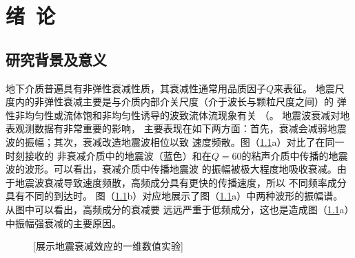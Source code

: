 


\newcommand{\citeA}[2]{\citeauthor{#1}\cite{#1}}

\chapter{绪~论}

\section{研究背景及意义}
地下介质普遍具有非弹性衰减性质，其衰减性通常用品质因子$Q$来表征。
地震尺度内的非弹性衰减主要是与介质内部介关尺度（介于波长与颗粒尺度之间）的
弹性非均匀性或流体饱和非均匀性诱导的波致流体流现象有关
（\citeA{pride:2003}，\citeA{muller:2010}）。
地震波衰减对地表观测数据有非常重要的影响，
主要表现在如下两方面：首先，衰减会减弱地震波的振幅；其次，衰减改造地震波相位以致
速度频散。图（\ref{fig:spectral}a）对比了在同一时刻接收的
非衰减介质中的地震波（蓝色）和在$Q=60$的粘声介质中传播的地震波的波形。可以看出，衰减介质中传播地震波
的振幅被极大程度地吸收衰减。由于地震波衰减导致速度频散，高频成分具有更快的传播速度，所以
不同频率成分具有不同的到达时。
图（\ref{fig:spectral}b）对应地展示了图（\ref{fig:spectral}a）中两种波形的振幅谱。
从图中可以看出，高频成分的衰减要
远远严重于低频成分，这也是造成图（\ref{fig:spectral}a）中振幅强衰减的主要原因。

\begin{figure}[!htbp]
        \centering
        [展示地震衰减效应的一维数值实验]
        \label{fig:spectral}
\end{figure}

